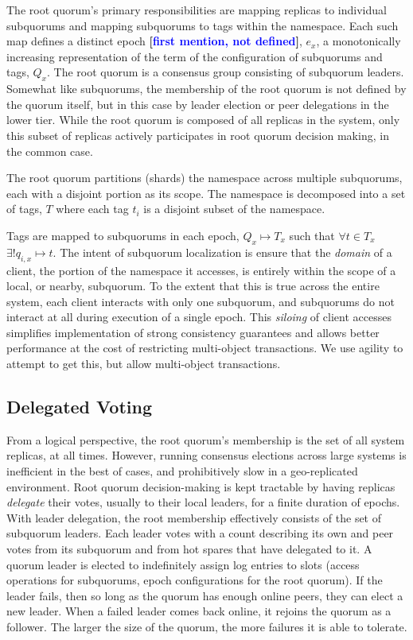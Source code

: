 \documentclass[11pt,conference]{IEEEtran}
\renewcommand{\pjk}[1]{{\bf
    [\marginpar[\hbox{{\textcolor{blue}{pjk}}\raisebox{0ex}{\Huge $\rightarrow$}}]%
{\hbox{\raisebox{0ex}{\Huge $\leftarrow$}{\textcolor{blue}{pjk}}}}\textcolor{blue}{#1}]}}
\begin{document}
The root quorum's primary responsibilities are mapping replicas to individual
subquorums and mapping subquorums to tags within the namespace.
Each such map defines a distinct epoch \pjk{first mention, not defined}, $e_x$, a monotonically increasing
representation of the term of the configuration of subquorums and tags,
$Q_x$.
The root quorum is a consensus group consisting of subquorum leaders.
Somewhat like subquorums, the membership of the root quorum is not defined
by the quorum itself, but in this case by leader election or peer delegations
in the lower tier.
While the root quorum is composed of all replicas in the system, only this
subset of replicas actively participates in root quorum decision making,
in the common case.

The root quorum partitions (shards) the namespace across multiple
subquorums, each with a disjoint portion as its scope.
The namespace is decomposed into a set of tags, $T$ where each tag $t_i$
is a disjoint subset of the namespace.

Tags are mapped to subquorums in each epoch, $Q_x \mapsto T_x$ such that
$\forall t \in T_x$ $\exists! q_{i,x} \mapsto t$.
The intent of subquorum localization is ensure that the \emph{domain} of
a client, the portion of the namespace it accesses, is entirely within
the scope of a local, or nearby, subquorum.
To the extent that this is true across the entire system, each client
interacts with only one subquorum, and subquorums do not interact at all
during execution of a single epoch.
This \emph{siloing} of client accesses simplifies implementation of
strong consistency guarantees and allows better performance at the cost
of restricting multi-object transactions.
We use agility to attempt to get this, but allow multi-object transactions.

\subsection{Delegated Voting}
From a logical perspective, the root quorum's membership is the set of
all system replicas, at all times.
However, running consensus elections across large systems is inefficient
in the best of cases, and prohibitively slow in a geo-replicated
environment.
Root quorum decision-making is kept tractable by having replicas
\emph{delegate} their votes, usually to their local leaders, for a finite
duration of epochs.
With leader delegation, the root membership effectively consists of the
set of subquorum leaders.
Each leader votes with a count describing its own and peer votes from its
subquorum and from hot spares that have delegated to it.
A quorum leader is elected to indefinitely assign log entries to slots
(access operations for subquorums, epoch configurations for the root
quorum).
If the leader fails, then so long as the quorum has enough online peers,
they can elect a new leader.
When a failed leader comes back online, it rejoins the quorum as a
follower.
The larger the size of the quorum, the more failures it is able to
tolerate.
\end{document}
